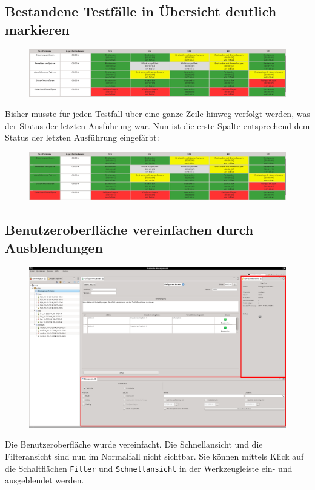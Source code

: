 \documentclass[11pt,a4paper,titlepage]{article}
\begin{document}
\subsection{Bestandene Testfälle in Übersicht deutlich markieren}
\begin{figure}[H]
 \centering
 \includegraphics[width=\textwidth]{./BilderAenderungen/uebersicht.png}
\end{figure}
Bisher musste für jeden Testfall über eine ganze Zeile hinweg verfolgt werden, was der Status der letzten Ausführung war.
Nun ist die erste Spalte entsprechend dem Status der letzten Ausführung eingefärbt:\\
\begin{figure}[H]
 \centering
 \includegraphics[width=\textwidth]{./BilderAenderungen/uebersicht-neu.png}
\end{figure}

\subsection{Benutzeroberfläche vereinfachen durch Ausblendungen}
\begin{figure}[H]
 \centering
 \includegraphics[width=\textwidth]{./BilderAenderungen/ansicht-vereinfachen.png}
\end{figure}
Die Benutzeroberfläche wurde vereinfacht.
Die Schnellansicht und die Filteransicht sind nun im Normalfall nicht sichtbar.
Sie können mittels Klick auf die Schaltflächen \texttt{Filter} und \texttt{Schnellansicht} in der Werkzeugleiste ein- und ausgeblendet werden.
\end{document}
